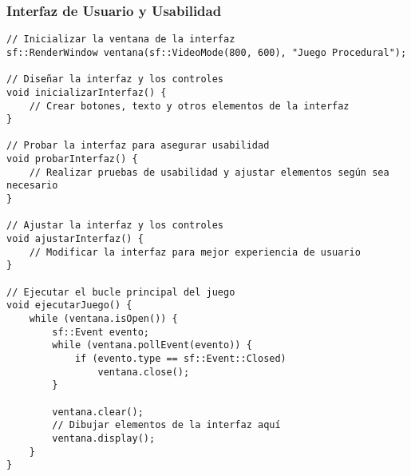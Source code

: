 \subsubsection{Interfaz de Usuario y Usabilidad}

\begin{verbatim}
// Inicializar la ventana de la interfaz
sf::RenderWindow ventana(sf::VideoMode(800, 600), "Juego Procedural");

// Diseñar la interfaz y los controles
void inicializarInterfaz() {
    // Crear botones, texto y otros elementos de la interfaz
}

// Probar la interfaz para asegurar usabilidad
void probarInterfaz() {
    // Realizar pruebas de usabilidad y ajustar elementos según sea necesario
}

// Ajustar la interfaz y los controles
void ajustarInterfaz() {
    // Modificar la interfaz para mejor experiencia de usuario
}

// Ejecutar el bucle principal del juego
void ejecutarJuego() {
    while (ventana.isOpen()) {
        sf::Event evento;
        while (ventana.pollEvent(evento)) {
            if (evento.type == sf::Event::Closed)
                ventana.close();
        }

        ventana.clear();
        // Dibujar elementos de la interfaz aquí
        ventana.display();
    }
}
\end{verbatim}

